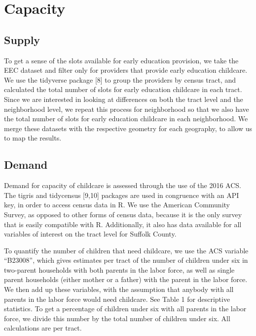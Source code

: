 \documentclass[10pt,letterpaper]{article}
\begin{document}
\section{Capacity}\label{capacity}

\subsection{Supply}\label{supply}

To get a sense of the slots available for early education provision, we
take the EEC dataset and filter only for providers that provide early
education childcare. We use the tidyverse package {[}8{]} to group the
providers by census tract, and calculated the total number of slots for
early education childcare in each tract. Since we are interested in
looking at differences on both the tract level and the neighborhood
level, we repeat this process for neighborhood so that we also have the
total number of slots for early education childcare in each
neighborhood. We merge these datasets with the respective geometry for
each geography, to allow us to map the results.

\subsection{Demand}\label{demand}

Demand for capacity of childcare is assessed through the use of the 2016
ACS. The tigris and tidycensus {[}9,10{]} packages are used in
congruence with an API key, in order to access census data in R. We use
the American Community Survey, as opposed to other forms of census data,
because it is the only survey that is easily compatible with R.
Additionally, it also has data available for all variables of interest
on the tract level for Suffolk County.

To quantify the number of children that need childcare, we use the ACS
variable ``B23008'', which gives estimates per tract of the number of
children under six in two-parent households with both parents in the
labor force, as well as single parent households (either mother or a
father) with the parent in the labor force. We then add up these
variables, with the assumption that anybody with all parents in the
labor force would need childcare. See Table 1 for descriptive
statistics. To get a percentage of children under six with all parents
in the labor force, we divide this number by the total number of
children under six. All calculations are per tract.
\end{document}
